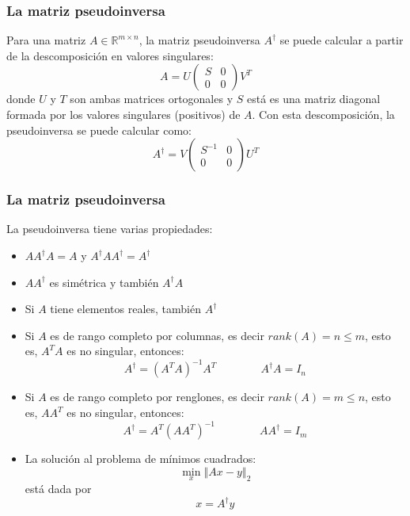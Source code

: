 \begin{frame}\frametitle{La matriz pseudoinversa}
  Para una matriz $A\in\mathbb{R}^{m\times n}$, la matriz pseudoinversa $A^\dagger$ se puede calcular a partir de la descomposición en valores singulares:
  \[A = U\left(\begin{array}{cc}S&0\\0&0\end{array}\right) V^T\]
  donde $U$ y $T$ son ambas matrices ortogonales y $S$ está es una matriz diagonal formada por los valores singulares (positivos) de $A$. Con esta descomposición, la pseudoinversa se puede calcular como:
  \[A^\dagger = V\left(\begin{array}{cc}S^{-1}&0\\0&0\end{array}\right) U^T\]
\end{frame}

\begin{frame}\frametitle{La matriz pseudoinversa}
  La pseudoinversa tiene varias propiedades:
  \begin{itemize}
  \item $AA^\dagger A = A$ y  $A^\dagger A A^\dagger = A^\dagger$
  \item $AA^\dagger$ es simétrica y también $A^\dagger A$
  \item Si $A$ tiene elementos reales, también $A^\dagger$
  \item Si $A$ es de rango completo por columnas, es decir $rank(A)=n\leq m$, esto es, $A^T A$ es no singular, entonces:
    \[A^\dagger = (A^T A)^{-1}A^T\qquad \qquad A^\dagger A = I_n\]
  \item Si $A$ es de rango completo por renglones, es decir $rank(A)=m\leq n$, esto es, $AA^T$ es no singular, entonces:
    \[A^\dagger = A^T(A A^T)^{-1}\qquad \qquad A A^\dagger = I_m\]
  \item La solución al problema de mínimos cuadrados:
    \[\min_x \left\Vert Ax - y \right\Vert_2 \]
      está dada por
      \[x = A^\dagger y\]
  \end{itemize}
\end{frame}


